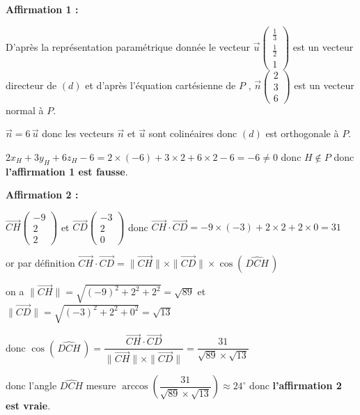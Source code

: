 \medskip

\textbf{Affirmation 1 :} 

D'après la représentation paramétrique donnée le vecteur $\overrightarrow{u} \begin{pmatrix}  \frac{1}{3} \\  \frac{1}{2}  \\1 \end{pmatrix}$ est un vecteur directeur de $(d)$ et d'après l'équation cartésienne de $P$ , $\overrightarrow{n} \begin{pmatrix}  2 \\  3  \\6 \end{pmatrix}$  est un vecteur normal à $P$.

$\overrightarrow{n}=6\,\overrightarrow{u}$ donc les vecteurs $\overrightarrow{n}$ et $\overrightarrow{u}$ sont colinéaires donc $(d)$ est orthogonale à $P$.

$2x_H + 3y_H + 6z_H - 6 = 2 \times (-6)+3 \times 2 + 6 \times 2 -6=-6 \neq 0 $ donc $H \notin P$ donc \textbf{ l'affirmation 1 est fausse}.
 

\textbf{Affirmation 2 :}  

$\overrightarrow{CH} \begin{pmatrix} -9 \\ 2 \\ 2 \end{pmatrix}$ et $\overrightarrow{CD} \begin{pmatrix} -3 \\2\\0 \end{pmatrix}$ donc $\overrightarrow{CH} \cdot \overrightarrow{CD}=-9 \times (-3) + 2\times 2 + 2 \times 0=31$

or par définition $\overrightarrow{CH} \cdot \overrightarrow{CD} = \| \overrightarrow{CH} \| \times \| \overrightarrow{CD} \| \times \cos \left( \, \widehat{DCH}\,\right)$

on a  $\| \overrightarrow{CH} \| = \sqrt{(-9)^2+2^2+2^2}=\sqrt{89}$ et $\| \overrightarrow{CD} \| = \sqrt{(-3)^2+2^2+0^2}=\sqrt{13}$ 

donc $\cos \left( \,\widehat{DCH}\,\right) = \dfrac{\overrightarrow{CH} \cdot \overrightarrow{CD} }{ \| \overrightarrow{CH} \| \times \| \overrightarrow{CD} \|}= \dfrac{31}{\sqrt{89} \times \sqrt{13}} $ 

donc l'angle $\widehat{DCH}$ mesure $\arccos \left( \dfrac{31}{\sqrt{89} \times \sqrt{13}} \right)\approx 24^\circ$ donc \textbf{l'affirmation 2 est vraie}.
 
